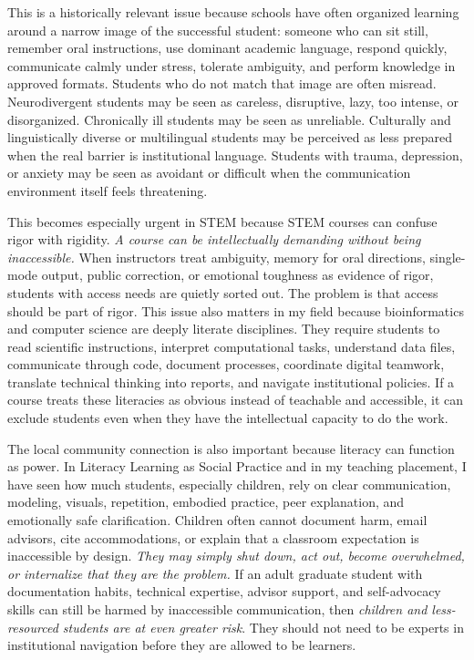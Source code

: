 \documentclass[11pt]{article}
\begin{document}
This is a historically relevant issue because schools have often organized learning around a narrow image of the successful student: someone who can sit still, remember oral instructions, use dominant academic language, respond quickly, communicate calmly under stress, tolerate ambiguity, and perform knowledge in approved formats. Students who do not match that image are often misread. Neurodivergent students may be seen as careless, disruptive, lazy, too intense, or disorganized. Chronically ill students may be seen as unreliable. Culturally and linguistically diverse or multilingual students may be perceived as less prepared when the real barrier is institutional language. Students with trauma, depression, or anxiety may be seen as avoidant or difficult when the communication environment itself feels threatening.

This becomes especially urgent in STEM because STEM courses can confuse rigor with rigidity. \textit{A course can be intellectually demanding without being inaccessible.} When instructors treat ambiguity, memory for oral directions, single-mode output, public correction, or emotional toughness as evidence of rigor, students with access needs are quietly sorted out. The problem is that access should be part of rigor. This issue also matters in my field because bioinformatics and computer science are deeply literate disciplines. They require students to read scientific instructions, interpret computational tasks, understand data files, communicate through code, document processes, coordinate digital teamwork, translate technical thinking into reports, and navigate institutional policies. If a course treats these literacies as obvious instead of teachable and accessible, it can exclude students even when they have the intellectual capacity to do the work.

The local community connection is also important because literacy can function as power. In Literacy Learning as Social Practice and in my teaching placement, I have seen how much students, especially children, rely on clear communication, modeling, visuals, repetition, embodied practice, peer explanation, and emotionally safe clarification. Children often cannot document harm, email advisors, cite accommodations, or explain that a classroom expectation is inaccessible by design. \textit{They may simply shut down, act out, become overwhelmed, or internalize that they are the problem.} If an adult graduate student with documentation habits, technical expertise, advisor support, and self-advocacy skills can still be harmed by inaccessible communication, then \textit{children and less-resourced students are at even greater risk}. They should not need to be experts in institutional navigation before they are allowed to be learners.
\end{document}
